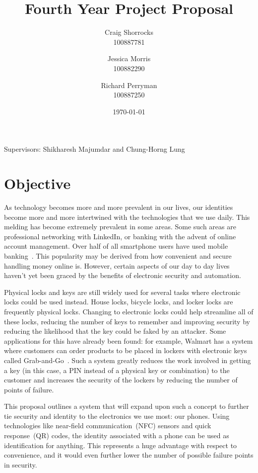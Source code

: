 \documentclass{article}
\title{Fourth Year Project Proposal}
\author{
	Craig Shorrocks \\
	100887781
	\and
	Jessica Morris \\
	100882290
	\and
	Richard Perryman \\
	100887250
}
\date{\today}
\begin{document}
\maketitle

\begin{center}
Supervisors: Shikharesh Majumdar and Chung-Horng Lung
\end{center}

\pagebreak

\tableofcontents

\pagebreak

\section{Objective}

As technology becomes more and more prevalent in our lives, our identities become more and more intertwined with the
technologies that we use daily. This melding has become extremely prevalent in some areas. Some such areas are
professional networking with LinkedIn, or banking with the advent of online account management. Over half of all
smartphone users have used mobile banking~\autocite{MOBILEBANKING}. This popularity may be derived
from how convenient and secure handling money online is. However, certain aspects of our day to day lives haven't yet
been graced by the benefits of electronic security and automation.

Physical locks and keys are still widely used for several tasks where electronic locks could be used instead. House
locks, bicycle locks, and locker locks are frequently physical locks. Changing to electronic locks could help streamline
all of these locks, reducing the number of keys to remember and improving security by reducing the likelihood that the
key could be faked by an attacker. Some applications for this have already been found: for example, Walmart has a
system where customers can order products to be placed in lockers with electronic keys called
Grab-and-Go~\autocite{WALMART}. Such a system greatly reduces the work involved in getting a key (in this case, a
PIN instead of a physical key or combination) to the customer and increases the security of the lockers by reducing the number
of points of failure.

This proposal outlines a system that will expand upon such a concept to further tie security and identity to the
electronics we use most: our phones. Using technologies like near-field communication~(NFC) sensors and quick response~(QR)
codes, the identity associated with a phone can be used as identification for anything. This represents a huge
advantage with respect to convenience, and it would even further lower the number of possible failure points in
security.
\end{document}

